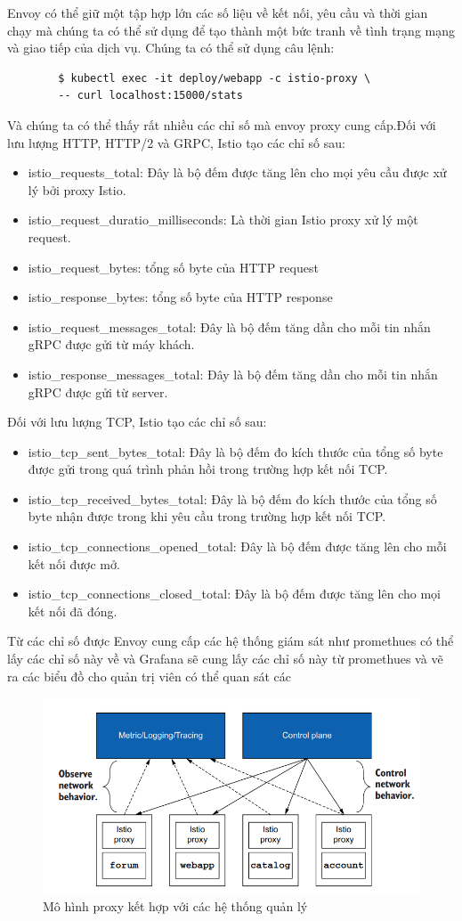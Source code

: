 \documentclass[12pt,a4paper]{report}
\begin{document}
{{	Envoy có thể giữ một tập hợp lớn các số liệu về kết nối, yêu cầu và thời gian chạy mà chúng ta có thể sử dụng để tạo thành một bức tranh về tình trạng mạng và giao tiếp của dịch vụ. Chúng ta có thể sử dụng câu lệnh:
	\begin{lstlisting}
		$ kubectl exec -it deploy/webapp -c istio-proxy \
		-- curl localhost:15000/stats
	\end{lstlisting}
	Và chúng ta có thể thấy rất nhiều các chỉ số mà envoy proxy cung cấp.Đối với lưu lượng HTTP, HTTP/2 và GRPC, Istio tạo các chỉ số sau:
	\begin{itemize}				
		\item istio\_requests\_total: Đây là bộ đếm được tăng lên cho mọi yêu cầu được xử lý bởi proxy Istio.
		\item istio\_request\_duratio\_milliseconds: Là thời gian Istio proxy xử lý một request.
		\item  istio\_request\_bytes: tổng số byte của HTTP request
		\item  istio\_response\_bytes: tổng số byte của HTTP response
		\item  istio\_request\_messages\_total: Đây là bộ đếm tăng dần cho mỗi tin nhắn gRPC được gửi từ máy khách.
		\item istio\_response\_messages\_total: Đây là bộ đếm tăng dần cho mỗi tin nhắn gRPC được gửi từ server.
	\end{itemize}
	Đối với lưu lượng TCP, Istio tạo các chỉ số sau:
	\begin{itemize}				
		\item istio\_tcp\_sent\_bytes\_total: Đây là bộ đếm đo kích thước của tổng số byte được gửi trong quá trình phản hồi trong trường hợp kết nối TCP.
		\item istio\_tcp\_received\_bytes\_total: Đây là bộ đếm đo kích thước của tổng số byte nhận được trong khi yêu cầu trong trường hợp kết nối TCP.
		\item istio\_tcp\_connections\_opened\_total: Đây là bộ đếm được tăng lên cho mỗi kết nối được mở.
		\item istio\_tcp\_connections\_closed\_total: Đây là bộ đếm được tăng lên cho mọi kết nối đã đóng.
	\end{itemize}
	Từ các chỉ số được Envoy cung cấp các hệ thống giám sát như promethues có thể lấy các chỉ số này về và Grafana sẽ cung lấy các chỉ số này từ promethues và vẽ ra các biểu đồ cho quản trị viên có thể quan sát các 
	
	\begin{figure}[h]
		\centering
		\includegraphics[width=0.5\linewidth]{Pics/2.3.1-p1}
		\caption{Mô hình proxy kết hợp với các hệ thống quản lý}
		\label{fig:2}
	

\end{figure}}}
\end{document}

